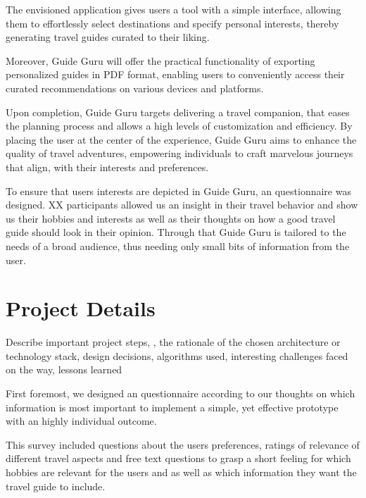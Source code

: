 \documentclass[english,notitlepage,smartquotes]{hgbreport}
\begin{document}
The envisioned application gives users a tool with a simple interface, allowing them to effortlessly select destinations and specify personal interests, thereby generating travel guides curated to their liking.

Moreover, Guide Guru will offer the practical functionality of exporting personalized guides in PDF format, enabling users to conveniently access their curated recommendations on various devices and platforms.

Upon completion, Guide Guru targets delivering a travel companion, that eases the planning process and allows a high levels of customization and efficiency. By placing the user at the center of the experience, Guide Guru aims to enhance the quality of travel adventures, empowering individuals to craft marvelous journeys that align, with their interests and preferences.

To ensure that users interests are depicted in Guide Guru, an questionnaire was designed. XX participants allowed us an insight in their travel behavior and show us their hobbies and interests as well as their thoughts on how a good travel guide should look in their opinion. Through that Guide Guru is tailored to the needs of a broad audience, thus needing only small bits of information from the user.

\chapter{Project Details}

Describe important project steps, \eg, the rationale of the chosen architecture
or technology stack, design decisions, algorithms used, interesting challenges
faced on the way, lessons learned \etc

\bigskip

First foremost, we designed an questionnaire according to our thoughts on which information is most important to implement a simple, yet effective prototype with an highly individual outcome.

This survey included questions about the users preferences, ratings of relevance of different travel aspects and free text questions to grasp a short feeling for which hobbies are relevant for the users and as well as which information they want the travel guide to include.

\end{document}
